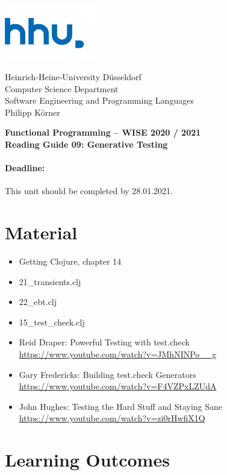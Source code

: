 \documentclass[11pt,a4paper]{article}
\begin{document}
\begin{minipage}[b]{\textwidth}
	\parbox[t]{5cm}{%
		\includegraphics[width=4cm]{unilogo}
		\hfill
	}
	\parbox[b]{11cm}{%
		Heinrich-Heine-University D\"usseldorf\\
		Computer Science Department\\
		Software Engineering and Programming Languages\\
		Philipp K\"orner
	}
\end{minipage}
\begin{center}
	\bf
	Functional Programming -- WISE 2020 / 2021\\
	Reading Guide 09: Generative Testing
\end{center}

\pagestyle{empty}

\paragraph{Deadline:} This unit should be completed by 28.01.2021.

\section{Material} 

\begin{itemize}
    \item Getting Clojure, chapter 14
	\item 21\_transients.clj
	\item 22\_ebt.clj
	\item 15\_test\_check.clj
	\item Reid Draper: Powerful Testing with test.check \url{https://www.youtube.com/watch?v=JMhNINPo__g}
	\item Gary Fredericks: Building test.check Generators \url{https://www.youtube.com/watch?v=F4VZPxLZUdA}
	\item John Hughes: Testing the Hard Stuff and Staying Sane \url{https://www.youtube.com/watch?v=zi0rHwfiX1Q}
\end{itemize}


\section{Learning Outcomes}
\end{document}
